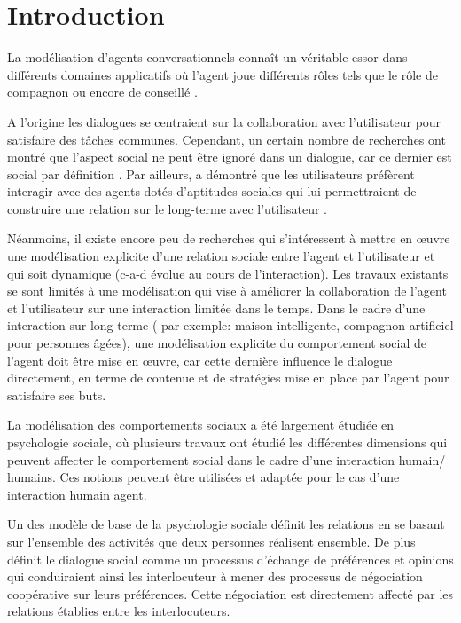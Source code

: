 \documentclass[a4paper,french]{article}
\begin{document}
\section{Introduction}

La modélisation d’agents conversationnels connaît un véritable essor dans différents domaines applicatifs où l'agent joue différents rôles tels que  le rôle de compagnon \cite{sidner2013always} ou encore de conseillé \cite{bickmore2005s}. 
\par A l'origine les dialogues se centraient sur la collaboration avec l’utilisateur pour satisfaire des tâches communes. Cependant, un certain nombre de recherches ont montré que l’aspect social ne peut être ignoré dans un dialogue, car ce dernier est social par définition \cite{markopoulos2005case}. Par ailleurs, \cite{moon1998intimate} a démontré que les utilisateurs préfèrent interagir avec des agents dotés d'aptitudes sociales qui lui permettraient de construire une relation sur le long-terme avec l'utilisateur \cite{bickmore2005establishing}.
 
\par Néanmoins, il existe encore peu de recherches qui s’intéressent à mettre en œuvre une modélisation explicite d’une relation sociale entre l’agent et l’utilisateur et qui soit dynamique (c-a-d évolue au cours de l'interaction). Les travaux existants se sont limités à une modélisation qui vise à améliorer la collaboration de l’agent et l'utilisateur sur une interaction limitée dans le temps. Dans le cadre d'une interaction sur long-terme ( par exemple: maison intelligente, compagnon artificiel pour personnes âgées), une modélisation explicite du comportement social de l’agent doit être mise en œuvre, car cette dernière influence le dialogue directement, en terme de contenue et de stratégies mise en place par l’agent pour satisfaire ses buts.

\par La modélisation des comportements sociaux a été largement étudiée en psychologie sociale, où plusieurs travaux ont étudié les différentes dimensions qui peuvent affecter le comportement social dans le cadre d’une interaction humain/ humains. Ces notions peuvent être utilisées et adaptée pour le cas d’une interaction humain agent.
\par Un des modèle de base de la psychologie sociale définit les relations en se basant sur l'ensemble des activités que deux personnes réalisent ensemble. De plus%
\cite{laver1981linguistic} définit le dialogue social comme un processus d'échange de préférences et opinions qui conduiraient ainsi les interlocuteur à mener des processus de négociation coopérative sur leurs préférences. Cette négociation est directement affecté par les relations établies entre les interlocuteurs.
\end{document}
